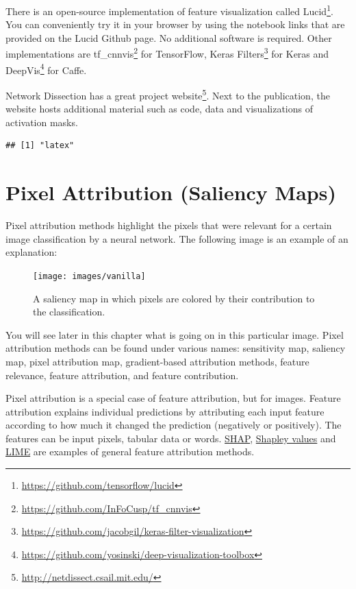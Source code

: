 \documentclass[
  11pt,
]{scrbook}
\renewcommand{\href}[2]{#2\footnote{\url{#1}}}
\begin{document}
There is an open-source implementation of feature visualization called \href{https://github.com/tensorflow/lucid}{Lucid}.
You can conveniently try it in your browser by using the notebook links that are provided on the Lucid Github page.
No additional software is required.
Other implementations are \href{https://github.com/InFoCusp/tf_cnnvis}{tf\_cnnvis} for TensorFlow, \href{https://github.com/jacobgil/keras-filter-visualization}{Keras Filters} for Keras and \href{https://github.com/yosinski/deep-visualization-toolbox}{DeepVis} for Caffe.

Network Dissection has a great \href{http://netdissect.csail.mit.edu/}{project website}.
Next to the publication, the website hosts additional material such as code, data and visualizations of activation masks.

\begin{verbatim}
## [1] "latex"
\end{verbatim}

\newpage

\hypertarget{pixel-attribution}{%
\section{Pixel Attribution (Saliency Maps)}\label{pixel-attribution}}

Pixel attribution methods highlight the pixels that were relevant for a certain image classification by a neural network.
The following image is an example of an explanation:

\begin{figure}

{\centering \texttt{[image: images/vanilla]} 

}

\caption{A saliency map in which pixels are colored by their contribution to the classification.}\label{fig:unnamed-chunk-58}
\end{figure}

You will see later in this chapter what is going on in this particular image.
Pixel attribution methods can be found under various names: sensitivity map, saliency map, pixel attribution map, gradient-based attribution methods, feature relevance, feature attribution, and feature contribution.

Pixel attribution is a special case of feature attribution, but for images.
Feature attribution explains individual predictions by attributing each input feature according to how much it changed the prediction (negatively or positively).
The features can be input pixels, tabular data or words.
\protect\hyperlink{shap}{SHAP}, \protect\hyperlink{shapley}{Shapley values} and \protect\hyperlink{lime}{LIME} are examples of general feature attribution methods.
\end{document}
